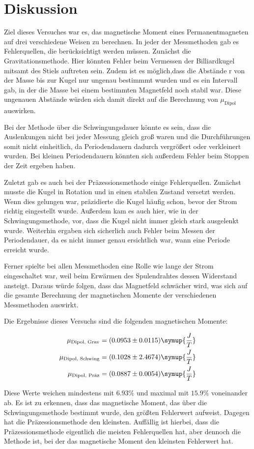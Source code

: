 \newpage 
\section{Diskussion}
Ziel dieses Versuches war es, das magnetische Moment eines Permanentmagneten auf drei verschiedene Weisen zu berechnen.
In jeder der Messmethoden gab es Fehlerquellen, die berücksichtigt werden müssen.
Zunächst die Gravitationsmethode. Hier könnten Fehler beim Vermessen der Billiardkugel mitsamt des Stiels auftreten sein. 
Zudem ist es möglich,dass die Abstände r von der Masse bis zur Kugel nur ungenau bestimmmt wurden und es ein Intervall gab, 
in der die Masse bei einem bestimmten Magnetfeld noch stabil war. Diese ungenauen Abstände würden sich damit direkt auf die
Berechnung von $\mu_{\text{Dipol}}$ auswirken. 

Bei der Methode über die Schwingungsdauer könnte es sein, dass die Auslenkungen nicht bei jeder Messung gleich groß waren und die 
Durchführungen somit nicht einheitlich, da Periodendauern dadurch vergrößert oder verkleinert wurden. Bei kleinen Periodendauern könnten
sich außerdem Fehler beim Stoppen der Zeit ergeben haben. 

Zuletzt gab es auch bei der Präzessionsmethode einige Fehlerquellen. Zunächst musste die Kugel in Rotation und in einen stabilen Zustand
versetzt werden. Wenn dies gelungen war, präzidierte die Kugel häufig schon, bevor der Strom richtig eingestellt wurde. Außerdem kam
es auch hier, wie in der Schwingungsmethode, vor, dass die Kugel nicht immer gleich stark ausgelenkt wurde. Weiterhin ergaben sich 
sicherlich auch Fehler beim Messen der Periodendauer, da es nicht immer genau ersichtlich war, wann eine Periode erreicht wurde. 

Ferner spielte bei allen Messmethoden eine Rolle wie lange der Strom eingeschaltet war, weil beim Erwärmen des Spulendrahtes dessen
Widerstand ansteigt. Daraus würde folgen, dass das Magnetfeld schwächer wird, was sich auf die gesamte Berechnung der magnetischen
Momente der verschiedenen Messmethoden auswirkt. 

Die Ergebnisse dieses Versuchs sind die folgenden magnetischen Momente:

\begin{equation*}
\begin{aligned}
\mu_{\text{Dipol, Grav}} &= (0.0953 \pm 0.0115) \symup{\frac{J}{T}} \\
\mu_{\text{Dipol, Schwing}} &= (0.1028 \pm 2.4674) \symup{\frac{J}{T}} \\
\mu_{\text{Dipol, Präz}} &= (0.0887 \pm 0.0054) \symup{\frac{J}{T}} 
\end{aligned}
\end{equation*}

Diese Werte weichen mindestens mit $6.93\%$ und maximal mit $15.9\%$ voneinander ab. Es ist zu erkennen, dass das magnetische Moment,
das über die Schwingungsmethode bestimmt wurde, den größten Fehlerwert aufweist. Dagegen hat die Präzessionsmethode den kleinsten.
Auffällig ist hierbei, dass die Präzessionsmethode eigentlich die meisten Fehlerquellen hat, aber dennoch die Methode ist, bei 
der das magnetische Moment den kleinsten Fehlerwert hat.

